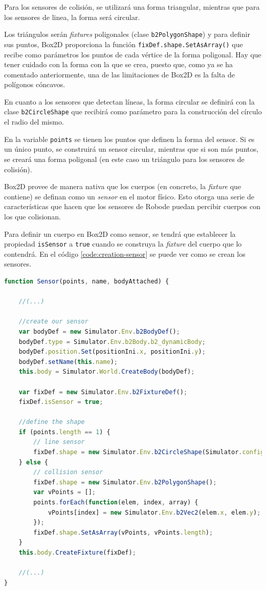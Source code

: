 Para los sensores de colisión, se utilizará una forma triangular, mientras que para los sensores de linea, la forma será circular.

Los triángulos serán \emph{fixtures} poligonales (clase \texttt{b2PolygonShape}) y para definir sus puntos, Box2D proporciona la función \texttt{fixDef.shape.SetAsArray()} que recibe como parámetros los puntos de cada vértice de la forma poligonal. Hay que tener cuidado con la forma con la que se crea, puesto que, como ya se ha comentado anteriormente, una de las limitaciones de Box2D es la falta de polígonos cóncavos. 

En cuanto a los sensores que detectan líneas, la forma circular se definirá con la clase \texttt{b2CircleShape} que recibirá como parámetro para la construcción del círculo el radio del mismo.

En la variable \texttt{points} se tienen los puntos que definen la forma del sensor. Si es un único punto, se construirá un sensor circular, mientras que si son más puntos, se creará una forma poligonal (en este caso un triángulo para los sensores de colisión).


Box2D provee de manera nativa que los cuerpos (en concreto, la \emph{fixture} que contiene) se definan como un \emph{sensor} en el motor físico. Esto otorga una serie de características que hacen que los sensores de Robode puedan percibir cuerpos con los que colisionan. 

Para definir un cuerpo en Box2D como sensor, se tendrá que establecer la propiedad \texttt{isSensor} a \texttt{true} cuando se construya la \emph{fixture} del cuerpo que lo contendrá. En el código \ref{code:creation-sensor} se puede ver como se crean los sensores. 

\begin{lstlisting}[language={Javascript},label={code:creation-sensor}, caption={Función que construye un sensor de Robode.}]
function Sensor(points, name, bodyAttached) {

    //(...)

    //create our sensor
    var bodyDef = new Simulator.Env.b2BodyDef();
    bodyDef.type = Simulator.Env.b2Body.b2_dynamicBody;
    bodyDef.position.Set(positionIni.x, positionIni.y);
    bodyDef.setName(this.name);
    this.body = Simulator.World.CreateBody(bodyDef);

    var fixDef = new Simulator.Env.b2FixtureDef();
    fixDef.isSensor = true;

    //define the shape
    if (points.length == 1) {
        // line sensor
        fixDef.shape = new Simulator.Env.b2CircleShape(Simulator.config.radiusInitSensorLine);
    } else {
        // collision sensor
        fixDef.shape = new Simulator.Env.b2PolygonShape();
        var vPoints = [];
        points.forEach(function(elem, index, array) {
            vPoints[index] = new Simulator.Env.b2Vec2(elem.x, elem.y);
        });
        fixDef.shape.SetAsArray(vPoints, vPoints.length);
    }
    this.body.CreateFixture(fixDef);

    //(...)
}
\end{lstlisting}

